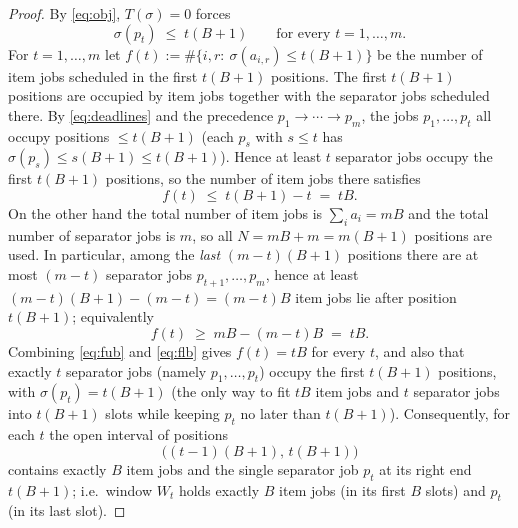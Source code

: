 \documentclass{amsart}
\theoremstyle{definition}
\theoremstyle{remark}
\begin{document}
\begin{proof}
By \eqref{eq:obj}, $T(\sigma)=0$ forces
\begin{equation}\label{eq:deadlines}
   \sigma(p_t)\;\le\;t(B+1)\qquad\text{for every }t=1,\dots,m .
\end{equation}
For $t=1,\dots,m$ let $f(t):=\#\{i,r:\ \sigma(a_{i,r})\le t(B+1)\}$ be the number of item
jobs scheduled in the first $t(B+1)$ positions. The first $t(B+1)$ positions are occupied
by item jobs together with the separator jobs scheduled there. By \eqref{eq:deadlines} and
the precedence $p_1\to\cdots\to p_m$, the jobs $p_1,\dots,p_t$ all occupy positions
$\le t(B+1)$ (each $p_s$ with $s\le t$ has $\sigma(p_s)\le s(B+1)\le t(B+1)$). Hence at
least $t$ separator jobs occupy the first $t(B+1)$ positions, so the number of item jobs
there satisfies
\begin{equation}\label{eq:fub}
   f(t)\;\le\;t(B+1)-t\;=\;tB .
\end{equation}
On the other hand the total number of item jobs is $\sum_i a_i=mB$ and the total number of
separator jobs is $m$, so all $N=mB+m=m(B+1)$ positions are used. In particular, among the
\emph{last} $(m-t)(B+1)$ positions there are at most $(m-t)$ separator jobs
$p_{t+1},\dots,p_m$, hence at least $(m-t)(B+1)-(m-t)=(m-t)B$ item jobs lie after position
$t(B+1)$; equivalently
\begin{equation}\label{eq:flb}
   f(t)\;\ge\;mB-(m-t)B\;=\;tB .
\end{equation}
Combining \eqref{eq:fub} and \eqref{eq:flb} gives $f(t)=tB$ for every $t$, and also
that exactly $t$ separator jobs (namely $p_1,\dots,p_t$) occupy the first $t(B+1)$
positions, with $\sigma(p_t)=t(B+1)$ (the only way to fit $tB$ item jobs and $t$ separator
jobs into $t(B+1)$ slots while keeping $p_t$ no later than $t(B+1)$). Consequently, for
each $t$ the open interval of positions
\[
   \bigl((t-1)(B+1),\,t(B+1)\bigr)
\]
contains exactly $B$ item jobs and the single separator job $p_t$ at its right end
$t(B+1)$; i.e.\ window $W_t$ holds exactly $B$ item jobs (in its first $B$ slots) and
$p_t$ (in its last slot).


\end{proof}
\end{document}
